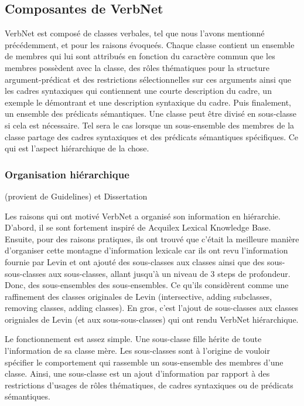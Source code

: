 \subsection {Composantes de VerbNet}  

VerbNet est composé de classes verbales, tel que nous l'avons mentionné précédemment, et pour les raisons évoqueés. Chaque classe contient un ensemble de membres qui lui sont attribués en fonction du caractère commun que les membres possèdent avec la classe, des rôles thématiques pour la structure argument-prédicat et des restrictions sélectionnelles sur ces arguments ainsi que les cadres syntaxiques qui contiennent une courte description du cadre, un exemple le démontrant et une description syntaxique du cadre. Puis finalement, un ensemble des prédicats sémantiques. Une classe peut être divisé en sous-classe si cela est nécessaire. Tel sera le cas lorsque un sous-ensemble des membres de la classe partage des cadres syntaxiques et des prédicats sémantiques spécifiques. Ce qui est l'aspect hiérarchique de la chose.

\subsubsection{Organisation hiérarchique}

(provient de Guidelines) et Dissertation

Les raisons qui ont motivé VerbNet a organisé son information en hiérarchie. D'abord, il se sont fortement inspiré de Acquilex Lexical Knowledge Base. Ensuite, pour des raisons pratiques, ils ont trouvé que c'était la meilleure manière d'organiser cette montagne d'information lexicale car ils ont revu l'information fournie par Levin et ont ajouté des sous-classes aux classes ainsi que des sous-sous-classes aux sous-classes, allant jusqu'à un niveau de 3 steps de profondeur. Donc, des sous-ensembles des sous-ensembles. Ce qu'ils considèrent comme une raffinement des classes originales de Levin (intersective, adding subclasses, removing classes, adding classes). En gros, c'est l'ajout de sous-classes aux classes origniales de Levin (et aux sous-sous-classes) qui ont rendu VerbNet hiérarchique. 

Le fonctionnement est assez simple. Une sous-classe fille hérite de toute l'information de sa classe mère. Les sous-classes sont à l'origine de vouloir spécifier le comportement qui rassemble un sous-ensemble des membres d'une classe. Ainsi, une sous-classe est un ajout d'information par rapport à des restrictions d'usages de rôles thématiques, de cadres syntaxiques ou de prédicats sémantiques. 

